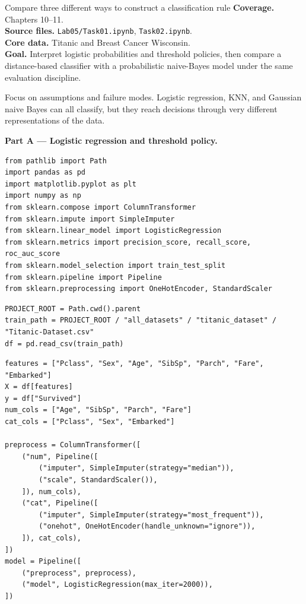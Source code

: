 
\begin{labproject}{Compare three different ways to construct a classification rule}
\textbf{Coverage.} Chapters 10--11.\\
\textbf{Source files.} \texttt{Lab05/Task01.ipynb}, \texttt{Task02.ipynb}.\\
\textbf{Core data.} Titanic and Breast Cancer Wisconsin.\\
\textbf{Goal.} Interpret logistic probabilities and threshold policies, then compare a distance-based classifier with a probabilistic naive-Bayes model under the same evaluation discipline.

\begin{labmode}
Focus on assumptions and failure modes. Logistic regression, KNN, and Gaussian naive Bayes can all classify, but they reach decisions through very different representations of the data.
\end{labmode}

\medskip\noindent\textbf{Part A --- Logistic regression and threshold policy.}\par
\begin{lstlisting}[style=mlpython]
from pathlib import Path
import pandas as pd
import matplotlib.pyplot as plt
import numpy as np
from sklearn.compose import ColumnTransformer
from sklearn.impute import SimpleImputer
from sklearn.linear_model import LogisticRegression
from sklearn.metrics import precision_score, recall_score, roc_auc_score
from sklearn.model_selection import train_test_split
from sklearn.pipeline import Pipeline
from sklearn.preprocessing import OneHotEncoder, StandardScaler
\end{lstlisting}

\begin{lstlisting}[style=mlpython]
PROJECT_ROOT = Path.cwd().parent
train_path = PROJECT_ROOT / "all_datasets" / "titanic_dataset" / "Titanic-Dataset.csv"
df = pd.read_csv(train_path)
\end{lstlisting}

\begin{lstlisting}[style=mlpython]
features = ["Pclass", "Sex", "Age", "SibSp", "Parch", "Fare", "Embarked"]
X = df[features]
y = df["Survived"]
num_cols = ["Age", "SibSp", "Parch", "Fare"]
cat_cols = ["Pclass", "Sex", "Embarked"]

preprocess = ColumnTransformer([
    ("num", Pipeline([
        ("imputer", SimpleImputer(strategy="median")),
        ("scale", StandardScaler()),
    ]), num_cols),
    ("cat", Pipeline([
        ("imputer", SimpleImputer(strategy="most_frequent")),
        ("onehot", OneHotEncoder(handle_unknown="ignore")),
    ]), cat_cols),
])
model = Pipeline([
    ("preprocess", preprocess),
    ("model", LogisticRegression(max_iter=2000)),
])


\end{lstlisting}
\end{labproject}
